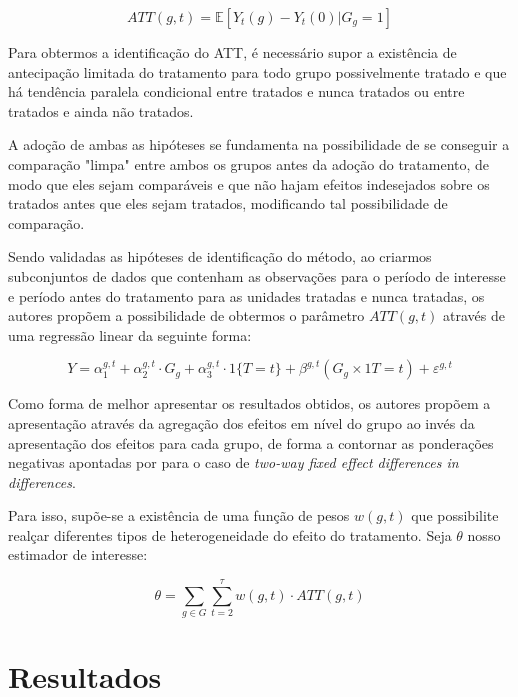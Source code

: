 \begin{equation}
    ATT(g,t) = \mathbb{E}[Y_t(g) - Y_t(0)|G_g = 1]
\end{equation}

Para obtermos a identificação do ATT, é necessário supor a existência de antecipação limitada do tratamento para todo grupo possivelmente tratado e que há tendência paralela condicional entre tratados e nunca tratados ou entre tratados e ainda não tratados.

A adoção de ambas as hipóteses se fundamenta na possibilidade de se conseguir a comparação "limpa" entre ambos os grupos antes da adoção do tratamento, de modo que eles sejam comparáveis e que não hajam efeitos indesejados sobre os tratados antes que eles sejam tratados, modificando tal possibilidade de comparação.

Sendo validadas as hipóteses de identificação do método, ao criarmos subconjuntos de dados que contenham as observações para o período de interesse e período antes do tratamento para as unidades tratadas e nunca tratadas, os autores propõem a possibilidade de obtermos o parâmetro $ATT(g,t)$ através de uma regressão linear da seguinte forma:

\begin{equation}\label{regressao_sem_covariados}
Y = \alpha_{1}^{g,t} + \alpha_{2}^{g,t} \cdot G_g + \alpha_{3}^{g,t} \cdot 1\{T=t\} + \beta^{g,t}(G_g \times 1 {T=t}) + \varepsilon^{g,t}
\end{equation}

Como forma de melhor apresentar os resultados obtidos, os autores propõem a apresentação através da agregação dos efeitos em nível do grupo ao invés da apresentação dos efeitos para cada grupo, de forma a contornar as ponderações negativas apontadas por \cite{Bacon_2021} para o caso de \textit{two-way fixed effect differences in differences}.

Para isso, supõe-se a existência de uma função de pesos $w(g,t)$ que possibilite realçar diferentes tipos de heterogeneidade do efeito do tratamento. Seja $\theta$ nosso estimador de interesse:

\begin{equation}
    \theta = \sum_{g \in G}\sum_{t=2}^\tau w(g,t)\cdot ATT(g,t)
\end{equation}
\chapter{Resultados} \label{resultados}

